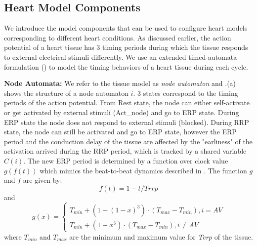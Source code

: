 \subsection{Heart Model Components}
We introduce the model components that can be used to configure heart models corresponding to different heart conditions. As discussed earlier, the action potential of a heart tissue has 3 timing periods during which the tissue responds to external electrical stimuli differently. We use an extended timed-automata formulation (\cite{timed_automata}) to model the timing behaviors of a heart tissue during each cycle. 

\textbf{Node Automata:} We refer to the tissue model as \emph{node automaton} and .(a) shows the structure of a node automaton $i$. 3 states correspond to the timing periods of the action potential. From \textsf{Rest} state, the node can either self-activate or get activated by external stimuli (Act\_node) and go to \textsf{ERP} state. During \textsf{ERP} state the node does not respond to external stimuli (blocked). During \textsf{RRP} state, the node can still be activated and go to \textsf{ERP} state, however the ERP period and the conduction delay of the tissue are affected by the "earliness" of the activation arrived during the RRP period, which is tracked by a shared variable $C(i)$. The new ERP period is determined by a function over clock value $g(f(t))$ which mimics the beat-to-beat dynamics described in \cite{josephson}. The function $g$ and $f$ are given by:
\begin{equation} \label{factor}
						f(t) = 1-t/Trrp
						\end{equation}
and
\begin{equation} \label{earliness_noAV}
						g(x) = \left\{
						\begin{array}{lr}
						
						T_{min}+(1-(1-x)^3)\cdot (T_{max}-T_{min}), i=AV\\
						T_{min}+(1-x^3)\cdot (T_{max}-T_{min}),i\neq AV
			
						
						\end{array}
						\right.
						\end{equation}  
where $T_{min}$ and $T_{max}$ are the minimum and maximum value for \emph{Terp} of the tissue.
